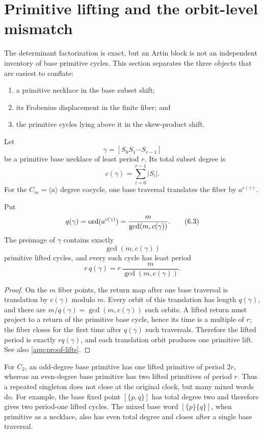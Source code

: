 \section{Primitive lifting and the orbit-level mismatch}
\label{sec:lifts}

The determinant factorization is exact, but an Artin block is not an
independent inventory of base primitive cycles.  This section separates the
three objects that are easiest to conflate:

\begin{enumerate}
  \item a primitive necklace in the base subset shift;
  \item its Frobenius displacement in the finite fiber; and
  \item the primitive cycles lying above it in the skew-product shift.
\end{enumerate}

Let
\[
\gamma=[S_0S_1\cdots S_{r-1}]
\tag{6.1}\label{6.1}
\]
be a primitive base necklace of least period \(r\).  Its total subset degree is
\[
c(\gamma)=\sum_{i=0}^{r-1}|S_i|.
\tag{6.2}\label{6.2}
\]
For the \(C_m=\langle a\rangle\) degree cocycle, one base traversal translates
the fiber by \(a^{c(\gamma)}\).

\begin{theorem}
\label{thm:primitive-lift}
Put
\[
q(\gamma)=\operatorname{ord}(a^{c(\gamma)})
=\frac{m}{\gcd(m,c(\gamma))}.
\tag{6.3}\label{6.3}
\]
The preimage of \(\gamma\) contains exactly
\[
\gcd(m,c(\gamma))
\tag{6.4}\label{6.4}
\]
primitive lifted cycles, and every such cycle has least period
\[
r\,q(\gamma)
=r\,\frac{m}{\gcd(m,c(\gamma))}.
\tag{6.5}\label{6.5}
\]
\end{theorem}

\begin{proof}
On the \(m\) fiber points, the return map after one base traversal is
translation by \(c(\gamma)\) modulo \(m\).  Every orbit of this translation
has length \(q(\gamma)\), and there are \(m/q(\gamma)=\gcd(m,c(\gamma))\)
such orbits.  A lifted return must project to a return of the primitive base
cycle, hence its time is a multiple of \(r\); the fiber closes for the first
time after \(q(\gamma)\) such traversals.  Therefore the lifted period is
exactly \(rq(\gamma)\), and each translation orbit produces one primitive
lift.  See also \cref{app:proof-lifts}.
\end{proof}

For \(C_2\), an odd-degree base primitive has one lifted primitive of period
\(2r\), whereas an even-degree base primitive has two lifted primitives of
period \(r\).  Thus a repeated singleton does not close at the original
clock, but many mixed words do.  For example, the base fixed point
\([\{p,q\}]\) has total degree two and therefore gives two period-one lifted
cycles.  The mixed base word \([\{p\}\{q\}]\), when primitive as a necklace,
also has even total degree and closes after a single base traversal.

